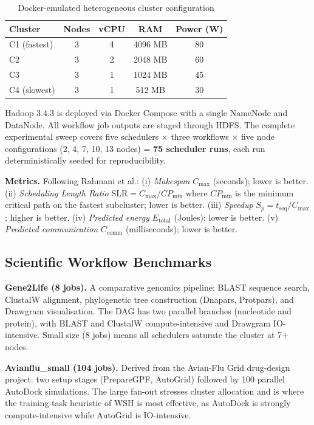 \documentclass[10pt,twocolumn]{article}
\begin{document}
\begin{table}[H]
\centering
\caption{Docker-emulated heterogeneous cluster configuration}
\label{tab:cluster}
\begin{tabular}{@{}lcccc@{}}
\toprule
\textbf{Cluster} & \textbf{Nodes} & \textbf{vCPU} & \textbf{RAM} & \textbf{Power (W)}\\
\midrule
C1 (fastest) & 3 & 4 & 4096 MB & 80 \\
C2           & 3 & 2 & 2048 MB & 60 \\
C3           & 3 & 1 & 1024 MB & 45 \\
C4 (slowest) & 3 & 1 &  512 MB & 30 \\
\bottomrule
\end{tabular}
\end{table}

Hadoop 3.4.3 is deployed via Docker Compose with a single NameNode and DataNode.
All workflow job outputs are staged through HDFS. The complete experimental sweep
covers five schedulers $\times$ three workflows $\times$ five node configurations
(2, 4, 7, 10, 13 nodes) = \textbf{75 scheduler runs}, each run deterministically
seeded for reproducibility.

\textbf{Metrics.} Following Rahmani et al.:
(i) \emph{Makespan} $C_{\max}$ (seconds); lower is better.
(ii) \emph{Scheduling Length Ratio} $\text{SLR} = C_{\max} / CP_{\min}$ where
$CP_{\min}$ is the minimum critical path on the fastest subcluster; lower is better.
(iii) \emph{Speedup} $S_p = t_{\text{seq}} / C_{\max}$; higher is better.
(iv) \emph{Predicted energy} $E_{\text{total}}$ (Joules); lower is better.
(v) \emph{Predicted communication} $C_{\text{comm}}$ (milliseconds); lower is better.

\subsection{Scientific Workflow Benchmarks}

\textbf{Gene2Life (8 jobs).}
A comparative genomics pipeline: BLAST sequence search, ClustalW alignment,
phylogenetic tree construction (Dnapars, Protpars), and Drawgram visualisation.
The DAG has two parallel branches (nucleotide and protein), with BLAST and ClustalW
compute-intensive and Drawgram IO-intensive. Small size (8 jobs) means all
schedulers saturate the cluster at 7+ nodes.

\textbf{Avianflu\_small (104 jobs).}
Derived from the Avian-Flu Grid drug-design project: two setup stages (PrepareGPF,
AutoGrid) followed by 100 parallel AutoDock simulations. The large fan-out stresses
cluster allocation and is where the training-task heuristic of WSH is most effective,
as AutoDock is strongly compute-intensive while AutoGrid is IO-intensive.
\end{document}
